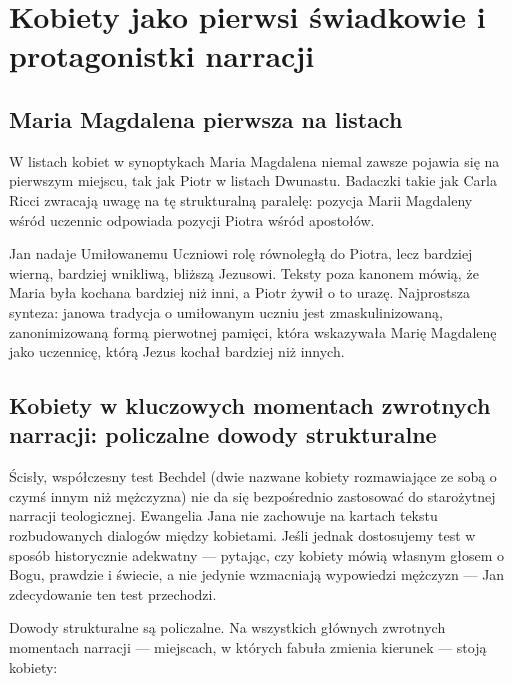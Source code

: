\section{Kobiety jako pierwsi świadkowie i protagonistki narracji}\label{sec:women-primary-witnesses}

\subsection{Maria Magdalena pierwsza na listach}\label{subsec:mary-first-in-lists}

W listach kobiet w synoptykach Maria Magdalena niemal zawsze pojawia się na pierwszym miejscu, tak jak Piotr w listach Dwunastu.
Badaczki takie jak Carla Ricci zwracają uwagę na tę strukturalną paralelę:
pozycja Marii Magdaleny wśród uczennic odpowiada pozycji Piotra wśród apostołów.

Jan nadaje Umiłowanemu Uczniowi rolę równoległą do Piotra, lecz bardziej wierną, bardziej wnikliwą, bliższą Jezusowi.
Teksty poza kanonem mówią, że Maria była kochana bardziej niż inni, a Piotr żywił o to urazę.
Najprostsza synteza: janowa tradycja o umiłowanym uczniu jest zmaskulinizowaną, zanonimizowaną formą pierwotnej pamięci, która wskazywała Marię Magdalenę jako uczennicę, którą Jezus kochał bardziej niż innych.

\subsection{Kobiety w kluczowych momentach zwrotnych narracji: policzalne dowody strukturalne}\label{subsec:the-gospel-of-john-passes-the-bechdel-test.}

Ścisły, współczesny test Bechdel (dwie nazwane kobiety rozmawiające ze sobą o czymś innym niż mężczyzna) nie da się bezpośrednio zastosować do starożytnej narracji teologicznej.
Ewangelia Jana nie zachowuje na kartach tekstu rozbudowanych dialogów między kobietami.
Jeśli jednak dostosujemy test w sposób historycznie adekwatny — pytając, czy kobiety mówią własnym głosem o Bogu, prawdzie i świecie, a nie jedynie wzmacniają wypowiedzi mężczyzn — Jan zdecydowanie ten test przechodzi.

Dowody strukturalne są policzalne.
Na wszystkich głównych zwrotnych momentach narracji — miejscach, w których fabuła zmienia kierunek — stoją kobiety:

